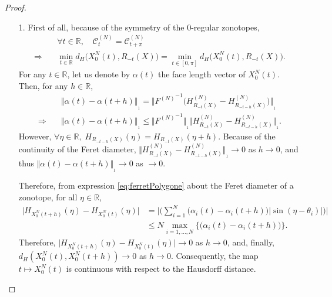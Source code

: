 \documentclass[numbers,compress,v1.0.1]{vmsta}
\theoremstyle{definition}
\begin{document}
\begin{proof}
$\:$
%
\begin{enumerate}
%
\item[1.] First of all, because of the symmetry of the $0$-regular zonotopes,
%
\begin{align*}
&\forall t\in\mathbb{R},\quad \mathcal{C}^{(N)}_t=\mathcal{C}^{(N)}_{t+\pi}\\
\Rightarrow\quad & \min_{t\in\mathbb{R}}d_H\big(X_0^{N}(t),R_{-t}(X)\big)=\min_{t\in[0,\pi]}d_H\big(X_0^{N}(t),R_{-t}(X)\big).
\end{align*}
%
For any $t\in\mathbb{R}$, let us denote by $\alpha(t)$ the face length
vector of $X_0^{N}(t)$. Then, for any $h\in\mathbb{R}$,
%
\begin{align*}
&\big\Vert\alpha(t)-\alpha(t+h)\big\Vert_{_1} =\big\Vert{F^{(N)}}^{-1}\bigl( H^{(N)}_{R_{-t}(X)}-H^{(N)}_{R_{-t-h}(X)}\bigr)\big\Vert _{_1}\\
\Rightarrow\quad &\big\Vert\alpha(t)-\alpha(t+h)\big\Vert_{_1} \leq\big\Vert{F^{(N)}}^{-1}\big\Vert_{_1}\big\Vert H^{(N)}_{R_{-t}(X)}-H^{(N)}_{R_{-t-h}(X)}\big\Vert_{_1}.
\end{align*}
%
However, $\forall\eta\in\mathbb{R},\; H_{R_{-t-h}(X)}(\eta
)=H_{R_{-t}(X)}(\eta+h)$. Because of the continuity of the Feret
diameter, $\Vert H^{(N)}_{R_{-t}(X)}-H^{(N)}_{R_{-t-h}(X)}\Vert
_{_1}\rightarrow0$ as $h\rightarrow0$, and thus $\Vert\alpha
(t)-\alpha(t+h)\Vert_{_1} \rightarrow0$ as $\rightarrow0$.

Therefore, from expression \eqref{eq:ferretPolygone} about the Feret
diameter of a zonotope, for all $\eta\in\mathbb{R}$,
%
\begin{align*}
\bigl\vert H_{X_0^{N}(t+h)}(\eta)- H_{X_0^{N}(t)}(\eta)\bigr\vert&= \Biggl\vert\Biggl(\sum_{i=1}^N \bigl(\alpha_i(t)-\alpha_i(t+h)\bigr)\bigl\vert\sin(\eta-\theta_i)\bigr\vert\Biggr)\Biggr\vert\\
&\leq N\underset{i=1,\dots, N} {\max}\bigl\lbrace\bigl(\alpha_i(t)-\alpha _i(t+h)\bigr)\bigr\rbrace.
\end{align*}
%
Therefore, $\vert H_{X_0^{N}(t+h)}(\eta)- H_{X_0^{N}(t)}(\eta)\vert
\rightarrow0$ as $h\rightarrow0$, and, finally,
$d_H(X_0^{N}(t),X_0^{N}(t+h))\rightarrow0$ as $h\rightarrow0$.
Consequently, the map $t\mapsto X_0^{N}(t)$ is continuous with respect
to the Hausdorff distance.


\end{enumerate}
\end{proof}
\end{document}
